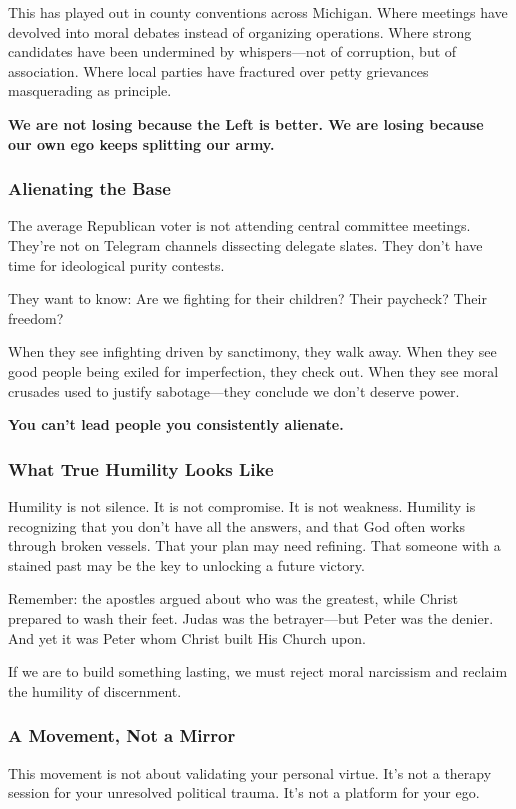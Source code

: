 This has played out in county conventions across Michigan. Where meetings have devolved into moral debates instead of organizing operations. Where strong candidates have been undermined by whispers—not of corruption, but of association. Where local parties have fractured over petty grievances masquerading as principle.

\textbf{We are not losing because the Left is better. We are losing because our own ego keeps splitting our army.}

\subsubsection*{Alienating the Base}
The average Republican voter is not attending central committee meetings. They’re not on Telegram channels dissecting delegate slates. They don’t have time for ideological purity contests.

They want to know: Are we fighting for their children? Their paycheck? Their freedom?

When they see infighting driven by sanctimony, they walk away. When they see good people being exiled for imperfection, they check out. When they see moral crusades used to justify sabotage—they conclude we don’t deserve power.

\textbf{You can’t lead people you consistently alienate.}

\subsubsection*{What True Humility Looks Like}
Humility is not silence. It is not compromise. It is not weakness. Humility is recognizing that you don’t have all the answers, and that God often works through broken vessels. That your plan may need refining. That someone with a stained past may be the key to unlocking a future victory.

Remember: the apostles argued about who was the greatest, while Christ prepared to wash their feet. Judas was the betrayer—but Peter was the denier. And yet it was Peter whom Christ built His Church upon.

If we are to build something lasting, we must reject moral narcissism and reclaim the humility of discernment.

\subsubsection*{A Movement, Not a Mirror}
This movement is not about validating your personal virtue. It’s not a therapy session for your unresolved political trauma. It’s not a platform for your ego.

